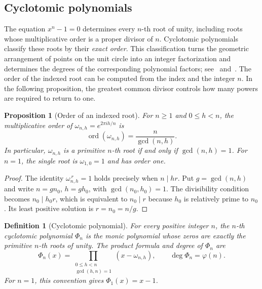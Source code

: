 \documentclass[11pt,a4paper]{article}
\numberwithin{equation}{section}
\theoremstyle{uprightpaper}
\newtheorem{proposition}{Proposition}[section]
\newtheorem{definition}{Definition}[section]
\begin{document}
\subsection{Cyclotomic polynomials}\label{sec:cyclotheory}

The equation $x^n-1=0$ determines every $n$-th root of unity, including roots whose multiplicative order is a proper divisor of $n$. Cyclotomic polynomials classify these roots by their \emph{exact order}. This classification turns the geometric arrangement of points on the unit circle into an integer factorization and determines the degrees of the corresponding polynomial factors; see~\cite[Section~13.6]{dummit2004} and~\cite{hardywright2008,irelandrosen1990}. The order of the indexed root can be computed from the index and the integer $n$. In the following proposition, the greatest common divisor controls how many powers are required to return to one.

\begin{proposition}[Order of an indexed root]\label{prop:rootorder-index}
For $n\geq1$ and $0\leq h<n$, the multiplicative order of
$\omega_{n,h}=e^{2\pi i h/n}$ is
\begin{equation}\label{eq:order-index}
 \operatorname{ord}(\omega_{n,h})=\frac{n}{\gcd(n,h)}.
\end{equation}
In particular, $\omega_{n,h}$ is a primitive $n$-th root if and only if
$\gcd(n,h)=1$. For $n=1$, the single root is $\omega_{1,0}=1$ and has
order one.
\end{proposition}
\begin{proof}
The identity $\omega_{n,h}^{\,r}=1$ holds precisely when $n\mid hr$.
Put $g=\gcd(n,h)$ and write $n=gn_0$, $h=gh_0$, with
$\gcd(n_0,h_0)=1$. The divisibility condition becomes
$n_0\mid h_0r$, which is equivalent to $n_0\mid r$ because
$h_0$ is relatively prime to $n_0$. Its least positive solution
is $r=n_0=n/g$.
\end{proof}

\begin{definition}[Cyclotomic polynomial]\label{def:cyclotomic}
For every positive integer $n$, the $n$-th \emph{cyclotomic polynomial}
$\Phi_n$ is the monic polynomial whose zeros are exactly the primitive
$n$-th roots of unity. The product formula and degree of $\Phi_n$ are
\begin{equation}\label{eq:cyclotomic-product}
 \Phi_n(x)=\prod_{\substack{0\leq h<n\\\gcd(h,n)=1}}
 (x-\omega_{n,h}),\qquad \deg\Phi_n=\varphi(n).
\end{equation}
For $n=1$, this convention gives $\Phi_1(x)=x-1$.
\end{definition}
\end{document}
